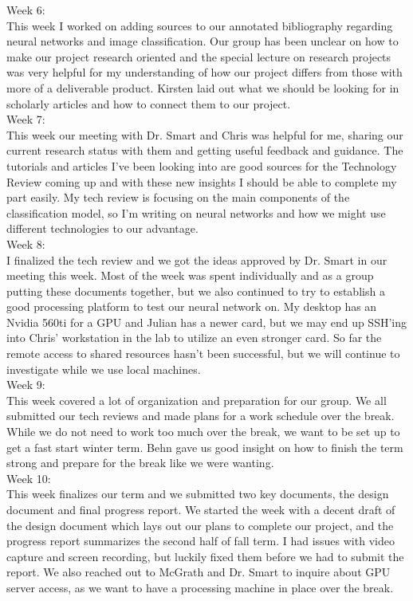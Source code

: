 \documentclass[draftclsnofoot, onecolumn, 10pt, compsoc]{IEEEtran}
\begin{document}
    	Week 6: \\ \indent This week I worked on adding sources to our annotated bibliography regarding neural networks and image classification. Our group has been unclear on how to make our project research oriented and the special lecture on research projects was very helpful for my understanding of how our project differs from those with more of a deliverable product. Kirsten laid out what we should be looking for in scholarly articles and how to connect them to our project. \\
    	Week 7: \\ \indent This week our meeting with Dr. Smart and Chris was helpful for me, sharing our current research status with them and getting useful feedback and guidance. The tutorials and articles I've been looking into are good sources for the Technology Review coming up and with these new insights I should be able to complete my part easily. My tech review is focusing on the main components of the classification model, so I'm writing on neural networks and how we might use different technologies to our advantage. \\
    	Week 8: \\ \indent I finalized the tech review and we got the ideas approved by Dr. Smart in our meeting this week. Most of the week was spent individually and as a group putting these documents together, but we also continued to try to establish a good processing platform to test our neural network on. My desktop has an Nvidia 560ti for a GPU and Julian has a newer card, but we may end up SSH'ing into Chris' workstation in the lab to utilize an even stronger card. So far the remote access to shared resources hasn't been successful, but we will continue to investigate while we use local machines. \\
    	Week 9: \\ \indent This week covered a lot of organization and preparation for our group. We all submitted our tech reviews and made plans for a work schedule over the break. While we do not need to work too much over the break, we want to be set up to get a fast start winter term.  Behn gave us good insight on how to finish the term strong and prepare for the break like we were wanting. \\
    	Week 10: \\ \indent This week finalizes our term and we submitted two key documents, the design document and final progress report. We started the week with a decent draft of the design document which lays out our plans to complete our project, and the progress report summarizes the second half of fall term. I had issues with video capture and screen recording, but luckily fixed them before we had to submit the report. We also reached out to McGrath and Dr. Smart to inquire about GPU server access, as we want to have a processing machine in place over the break.
        
\end{document}
